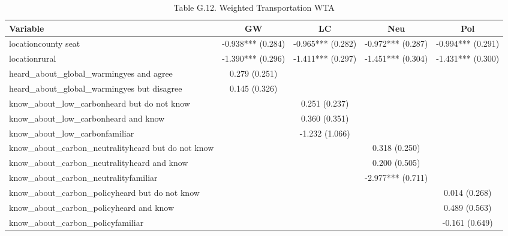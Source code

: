 \begin{table}[!htbp]
\centering
\caption{Table G.12. Weighted Transportation WTA}
\begin{tabular}{lcccc}
\hline
Variable & GW & LC & Neu & Pol \\
\hline
locationcounty seat & -0.938*** (0.284) & -0.965*** (0.282) & -0.972*** (0.287) & -0.994*** (0.291) \\
locationrural & -1.390*** (0.296) & -1.411*** (0.297) & -1.451*** (0.304) & -1.431*** (0.300) \\
heard\_about\_global\_warmingyes and agree & 0.279 (0.251) &  &  &  \\
heard\_about\_global\_warmingyes but disagree & 0.145 (0.326) &  &  &  \\
know\_about\_low\_carbonheard but do not know &  & 0.251 (0.237) &  &  \\
know\_about\_low\_carbonheard and know &  & 0.360 (0.351) &  &  \\
know\_about\_low\_carbonfamiliar &  & -1.232 (1.066) &  &  \\
know\_about\_carbon\_neutralityheard but do not know &  &  & 0.318 (0.250) &  \\
know\_about\_carbon\_neutralityheard and know &  &  & 0.200 (0.505) &  \\
know\_about\_carbon\_neutralityfamiliar &  &  & -2.977*** (0.711) &  \\
know\_about\_carbon\_policyheard but do not know &  &  &  & 0.014 (0.268) \\
know\_about\_carbon\_policyheard and know &  &  &  & 0.489 (0.563) \\
know\_about\_carbon\_policyfamiliar &  &  &  & -0.161 (0.649) \\
\hline
\end{tabular}
\end{table}
